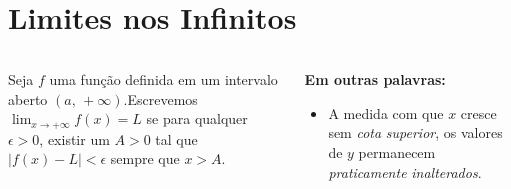\section{Limites nos Infinitos}

\begin{frame}
  \begin{columns}[onlytextwidth]
    \begin{column}{0.55\textwidth}\vspace{-0.5cm}
      \begin{definition}
        Seja $f$ uma função definida em um intervalo \\aberto $(a,\,+\infty)$.Escrevemos $\displaystyle\lim_{x\rightarrow +\infty}f(x)=L$ se para qualquer $\epsilon>0$, existir um $A>0$ tal que $|f(x)-L| < \epsilon$ sempre que $x > A$.
      \end{definition}
    \end{column}
    \begin{column}{0.44\textwidth}\vspace{-0.5cm}
      \begin{highlight}
        \textbf{Em outras palavras:}
        \begin{itemize}
          \item A medida com que $x$ cresce sem \emph{cota} \emph{superior}, os valores de $y$ permanecem \emph{praticamente} \emph{inalterados}.
        \end{itemize}
      \end{highlight}
    \end{column}
  \end{columns}
  \vspace*{-0.5cm}
  \begin{figure}
  \end{figure}
\end{frame}

